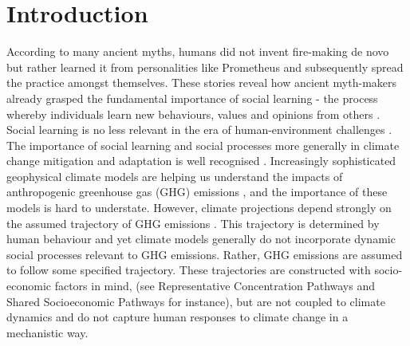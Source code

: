 \documentclass[10pt,letterpaper]{article}
\begin{document}
\linenumbers

\section*{Introduction}
According to many ancient myths, humans did not invent fire-making de novo but rather learned it from personalities like Prometheus and subsequently spread the practice amongst themselves. These stories reveal how ancient myth-makers already grasped the fundamental importance of social learning - the process whereby individuals learn new behaviours, values and opinions from others \cite{reed10}. Social learning is no less relevant in the era of human-environment challenges \cite{henderson16,bauch16,galvani16}. The importance of social learning and social processes more generally in climate change mitigation and adaptation is well recognised \cite{castree14,clayton15,bollinger12,baird14}. Increasingly sophisticated geophysical climate models are helping us understand the impacts of anthropogenic greenhouse gas (GHG) emissions \cite{bopp13,collins11,sterman12}, and the importance of these models is hard to understate. However, climate projections depend strongly on the assumed trajectory of GHG emissions \cite{vuuren11}. This trajectory is determined by human behaviour and yet climate models generally do not incorporate dynamic social processes relevant to GHG emissions. Rather, GHG emissions are assumed to follow some specified trajectory.  These trajectories are constructed with socio-economic factors in mind, (see Representative Concentration Pathways \cite{vuuren11} and Shared Socioeconomic Pathways \cite{oneill14} for instance), but are not coupled to climate dynamics and do not capture human responses to climate change in a mechanistic way.
\end{document}
